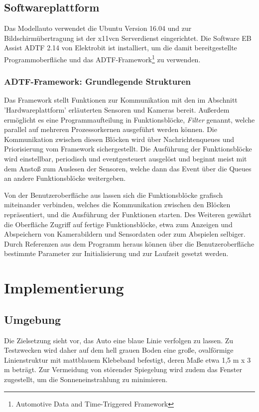 \documentclass[12pt, a4paper]{scrartcl}
\begin{document}
\subsection{Softwareplattform}
Das Modellauto verwendet die Ubuntu Version 16.04 und zur Bildschirmübertragung ist der x11vcn Serverdienst eingerichtet. Die Software EB Assist ADTF 2.14 von Elektrobit ist installiert, um die damit bereitgestellte Programmoberfläche und das ADTF-Framework\footnote{Automotive Data and Time-Triggered Framework\cite{adtf-website}} zu verwenden.

\subsubsection{ADTF-Framework: Grundlegende Strukturen}
 Das Framework stellt Funktionen zur Kommunikation mit den im Abschnitt 'Hardwareplattform' erläuterten Sensoren und Kameras bereit. Außerdem ermöglicht es eine Programmaufteilung in Funktionsblöcke, \emph{Filter} genannt, welche parallel auf mehreren Prozessorkernen ausgeführt werden können. Die Kommunikation zwischen diesen Blöcken wird über Nachrichtenqueues und Priorisierung vom Framework sichergestellt. Die Ausführung der Funktionsblöcke wird einstellbar, periodisch und eventgesteuert ausgelöst und beginnt meist mit dem Anstoß zum Auslesen der Sensoren, welche dann das Event über die Queues an andere Funktionsblöcke weitergeben.

Von der Benutzeroberfläche aus lassen sich die Funktionsblöcke grafisch miteinander verbinden, welches die Kommunikation zwischen den Blöcken repräsentiert, und die Ausführung der Funktionen starten. Des Weiteren gewährt die Oberfläche Zugriff auf fertige Funktionsblöcke, etwa zum Anzeigen und Abspeichern von Kamerabildern und Sensordaten oder zum  Abspielen selbiger.
Durch Referenzen aus dem Programm heraus können über die Benutzeroberfläche bestimmte Parameter zur Initialisierung und zur Laufzeit gesetzt werden.


\newpage
\section{Implementierung}

\subsection{Umgebung}

Die Zielsetzung sieht vor, das Auto eine blaue Linie verfolgen zu lassen. Zu Testzwecken wird daher auf dem hell grauen Boden eine große, ovalförmige Linienstruktur mit mattblauem Klebeband befestigt, deren Maße etwa 1,5 m x 3 m beträgt. Zur Vermeidung von störender Spiegelung wird zudem das Fenster zugestellt, um die Sonneneinstrahlung zu minimieren.
\end{document}

